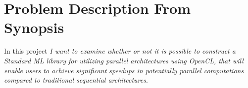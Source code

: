 \section{Problem Description From Synopsis}

In this project \emph{I want to examine whether or not it is possible
  to construct a Standard ML library for utilizing parallel
  architectures using OpenCL, that will enable users to achieve
  significant speedups in potentially parallel computations compared
  to traditional sequential architectures}.
